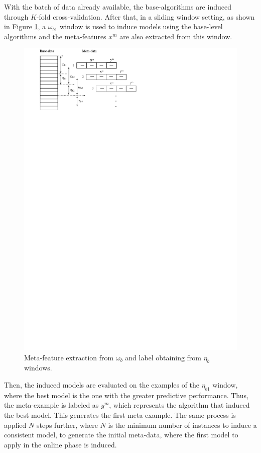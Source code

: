 With the batch of data already available, the base-algorithms are induced through $K$-fold cross-validation.
After that, in a sliding window setting, as shown in Figure \ref{fig:ms_diag0_off}, a $\omega_{b1}$ window is used to induce models using the base-level algorithms and the meta-features $x^m$ are also extracted from this window. %

\begin{figure}[ht]
    \centering
    \includegraphics[width=\linewidth]{img/ms_diag0_off.svg}
    \caption{Meta-feature extraction from $\omega_b$ and label obtaining from
    $\eta_b$ windows.}
    \label{fig:ms_diag0_off}
\end{figure}

Then, the induced models are evaluated on the examples of the $\eta_{b1}$ window, where the best model is the one with the greater predictive performance. Thus, the meta-example is labeled as $y^m$, which represents the algorithm that induced the best model. This generates the first meta-example. The same process is applied $N$ steps further, where $N$ is the minimum number of instances to induce a consistent model, 
to generate the initial meta-data, where the first model to apply in the online phase is induced.

